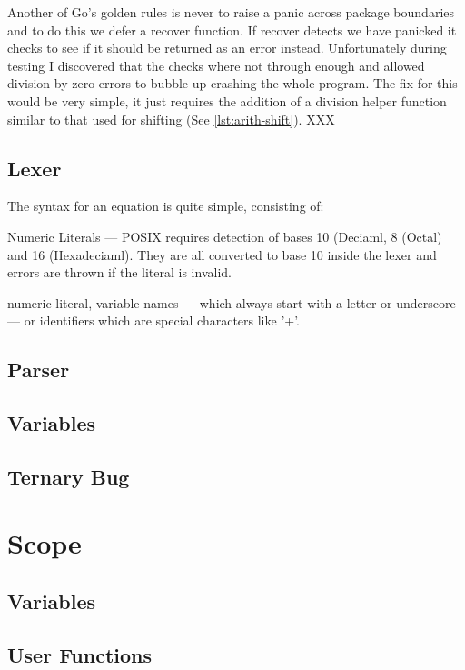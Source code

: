 Another of Go's golden rules is never to raise a panic across package boundaries and to do this we defer a recover function.
If recover detects we have panicked it checks to see if it should be returned as an error instead.
Unfortunately during testing I discovered that the checks where not through enough and allowed division by zero errors to bubble up crashing the whole program. 
The fix for this would be very simple, it just requires the addition of a division helper function similar to that used for shifting (See \ref{lst:arith-shift}). XXX %

\subsection{Lexer}
The syntax for an equation is quite simple, consisting of:
\begin{itemize*}
	\item Numeric Literals --- POSIX requires detection of bases 10 (Deciaml, 8 (Octal) and 16 (Hexadeciaml). They are all converted to base 10 inside the lexer and errors are thrown if the literal is invalid.
    \item 

\end{itemize*}
numeric literal, variable names --- which always start with a letter or underscore --- or identifiers which are special characters like '+'.


\subsection{Parser}

\subsection{Variables}
\subsection{Ternary Bug}

\section{Scope}

\subsection{Variables}
\subsection{User Functions}
